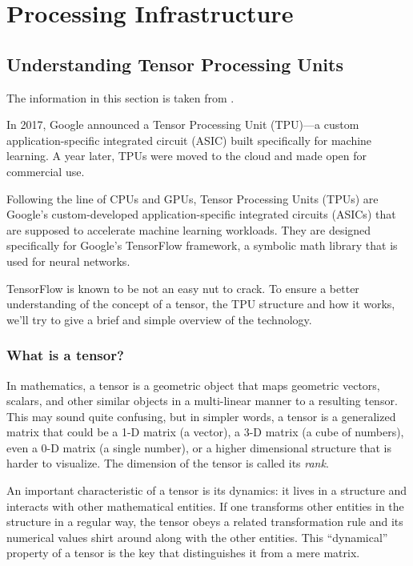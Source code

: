 
\chapter{Processing Infrastructure}
\label{sec:ProcessingInfrastructure} 

\section{Understanding Tensor Processing Units}
\label{sec:UnderstandingTensorProcessingUnits} 

The information in this section is taken from \cite{SciForce2019}.

In 2017, Google announced a Tensor Processing Unit (TPU)---a custom application-specific integrated circuit (ASIC) built specifically for machine learning. A year later, TPUs were moved to the cloud and made open for commercial use.

Following the line of CPUs and GPUs, Tensor Processing Units (TPUs) are Google’s custom-developed application-specific integrated circuits (ASICs) that are supposed to accelerate machine learning workloads. They are designed specifically for Google’s TensorFlow framework, a symbolic math library that is used for neural networks.

TensorFlow is known to be not an easy nut to crack. To ensure a better understanding of the concept of a tensor, the TPU structure and how it works, we’ll try to give a brief and simple overview of the technology.

\subsection{What is a tensor?}

In mathematics, a tensor is a geometric object that maps geometric vectors, scalars, and other similar objects in a multi-linear manner to a resulting tensor. This may sound quite confusing, but in simpler words, a tensor is a generalized matrix that could be a 1-D matrix (a vector), a 3-D matrix (a cube of numbers), even a 0-D matrix (a single number), or a higher dimensional structure that is harder to visualize. The dimension of the tensor is called its \textit{rank}.

An important characteristic of a tensor is its dynamics: it lives in a structure and interacts with other mathematical entities. If one transforms other entities in the structure in a regular way, the tensor obeys a related transformation rule and its numerical values shirt around along with the other entities. This ``dynamical'' property of a tensor is the key that distinguishes it from a mere matrix.

